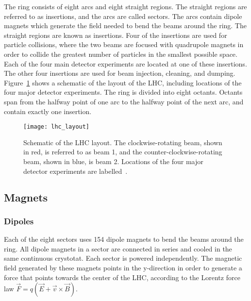 The ring consists of eight arcs and eight straight regions.
The straight regions are referred to as insertions, and the arcs are called sectors.
The arcs contain dipole magnets which generate the field needed to bend the beams around the ring.
The straight regions are known as insertions.
Four of the insertions are used for particle collisions,
where the two beams are focused with quadrupole magnets in order to collide the greatest number of particles in the smallest possible space.
Each of the four main detector experiments are located at one of these insertions.
The other four insertions are used for beam injection, cleaning, and dumping.
Figure~\ref{fig:lhc_layout} shows a schematic of the layout of the LHC, including locations of the four major detector experiments.
The ring is divided into eight octants.
Octants span from the halfway point of one arc to the halfway point of the next arc,
and contain exactly one insertion.

\begin{figure}[!ht]\centering
\texttt{[image: lhc\_layout]}
\caption{Schematic of the LHC layout.
The clockwise-rotating beam, shown in red, is referred to as beam 1, and the counter-clockwise-rotating beam, shown in blue, is beam 2.
Locations of the four major detector experiments are labelled~\cite{lhc-machine-2008}.}
\label{fig:lhc_layout}
\end{figure}

\subsection{Magnets}\label{subsec:lhc_magnets}

\subsubsection{Dipoles}
Each of the eight sectors uses 154 dipole magnets to bend the beams around the ring.
All dipole magnets in a sector are connected in series and cooled in the same continuous crystotat.
Each sector is powered independently.
The magnetic field generated by these magnets points in the y-direction
in order to generate a force that points towards the center of the LHC,
according to the Lorentz force law $\vec{F} = q\left(\vec{E}+\vec{v}\times\vec{B}\right)$.

